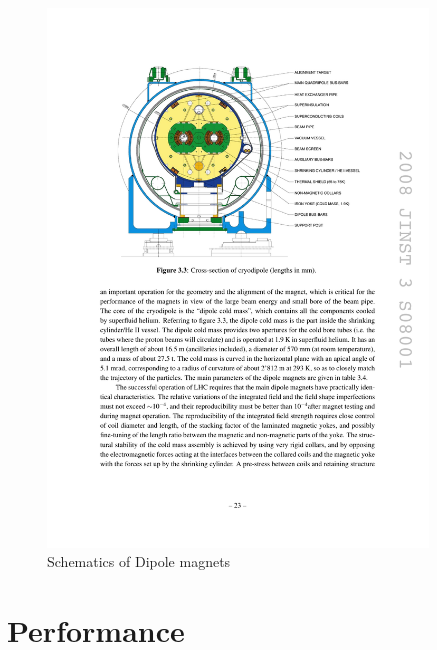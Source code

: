 \begin{figure}[htbp]
	\centering
		\includegraphics[width=0.9\textwidth]{Figures/LHC_magnet.pdf}
	\caption[Schematics of dipole magnets]{Schematics of Dipole magnets}
	\label{fig:LHC_mag}
\end{figure}


\section{Performance}
